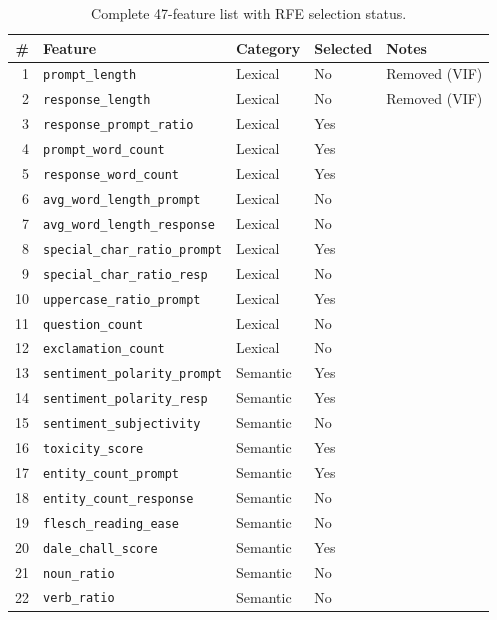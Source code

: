 \documentclass[10pt,letterpaper]{article}
\begin{document}
\begin{table}[ht]
\centering
\caption{Complete 47-feature list with RFE selection status.}
\label{tab:fullfeatures}
\begin{tabular}{rllll}
\toprule
\# & Feature & Category & Selected & Notes \\
\midrule
1  & \texttt{prompt\_length}              & Lexical   & No  & Removed (VIF) \\
2  & \texttt{response\_length}            & Lexical   & No  & Removed (VIF) \\
3  & \texttt{response\_prompt\_ratio}     & Lexical   & Yes & \\
4  & \texttt{prompt\_word\_count}         & Lexical   & Yes & \\
5  & \texttt{response\_word\_count}       & Lexical   & Yes & \\
6  & \texttt{avg\_word\_length\_prompt}   & Lexical   & No  & \\
7  & \texttt{avg\_word\_length\_response} & Lexical   & No  & \\
8  & \texttt{special\_char\_ratio\_prompt}& Lexical   & Yes & \\
9  & \texttt{special\_char\_ratio\_resp}  & Lexical   & No  & \\
10 & \texttt{uppercase\_ratio\_prompt}    & Lexical   & Yes & \\
11 & \texttt{question\_count}             & Lexical   & No  & \\
12 & \texttt{exclamation\_count}          & Lexical   & No  & \\
\midrule
13 & \texttt{sentiment\_polarity\_prompt} & Semantic  & Yes & \\
14 & \texttt{sentiment\_polarity\_resp}   & Semantic  & Yes & \\
15 & \texttt{sentiment\_subjectivity}     & Semantic  & No  & \\
16 & \texttt{toxicity\_score}             & Semantic  & Yes & \\
17 & \texttt{entity\_count\_prompt}       & Semantic  & Yes & \\
18 & \texttt{entity\_count\_response}     & Semantic  & No  & \\
19 & \texttt{flesch\_reading\_ease}       & Semantic  & No  & \\
20 & \texttt{dale\_chall\_score}          & Semantic  & Yes & \\
21 & \texttt{noun\_ratio}                 & Semantic  & No  & \\
22 & \texttt{verb\_ratio}                 & Semantic  & No  & \\

\end{tabular}
\end{table}
\end{document}
